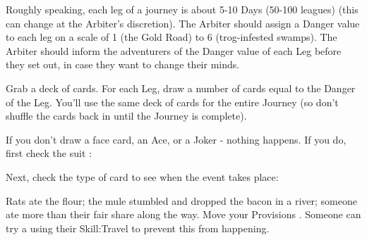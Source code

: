 {\begin{multicols}{2}

Roughly speaking, each leg of a journey is about 5-10 Days (50-100 leagues) (this can change at the Arbiter's discretion).  The Arbiter should assign a Danger value to each leg on a scale of 1 (the Gold Road) to 6 (trog-infested swamps).  The Arbiter should inform the adventurers of the Danger value of each Leg before they set out, in case they want to change their minds.

Grab a deck of cards.  For each Leg, draw a number of cards equal to the Danger of the Leg.  You'll use the same deck of cards for the entire Journey (so don't shuffle the cards back in until the Journey is complete).

If you don't draw a face card, an Ace, or a Joker - nothing happens.  If you do, first check the suit :


  Next, check the type of card to see when the event takes place:





  Rats ate the flour; the mule stumbled and dropped the bacon in a river; someone ate more than their fair share along the way.  Move your Provisions \DCDOWN.  Someone can try a \RO using their Skill:Travel to prevent this from happening.



\end{multicols}}
